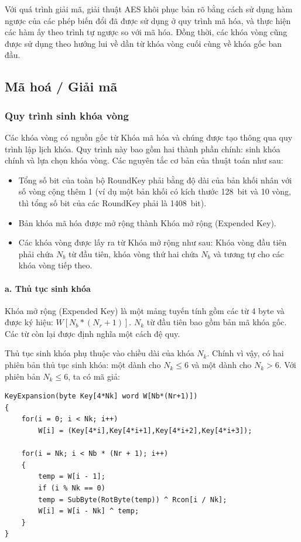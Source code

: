Với quá trình giải mã, giải thuật AES khôi phục bản rõ bằng cách sử dụng hàm ngược của các phép biến đổi đã được sử dụng ở quy trình mã hóa, và thực hiện các hàm ấy theo trình tự ngược so với mã hóa. Đồng thời, các khóa vòng cũng được sử dụng theo hướng lui về dần từ khóa vòng cuối cùng về khóa gốc ban đầu.

\subsection{Mã hoá / Giải mã}

\subsubsection{Quy trình sinh khóa vòng}

Các khóa vòng có nguồn gốc từ Khóa mã hóa và chúng được tạo thông qua quy trình lập lịch khóa. Quy trình này bao gồm hai thành phần chính: sinh khóa chính và lựa chọn khóa vòng. Các nguyên tắc cơ bản của thuật toán như sau:
\begin{itemize}
	\item Tổng số bit của toàn bộ RoundKey phải bằng độ dài của bản khối nhân với số vòng cộng thêm 1 (ví dụ một bản khối có kích thước 128~bit và 10 vòng, thì tổng số bit của các RoundKey phải là 1408~bit).
	\item Bản khóa mã hóa được mở rộng thành Khóa mở rộng (Expended Key).
	\item Các khóa vòng được lấy ra từ Khóa mở rộng như sau: Khóa vòng đầu tiên phải chứa $N_b$ từ đầu tiên, khóa vòng thứ hai chứa $N_b$ và tương tự cho các khóa vòng tiếp theo.
\end{itemize}

\paragraph{a. Thủ tục sinh khóa}\quad

Khóa mở rộng (Expended Key) là một mảng tuyến tính gồm các từ 4 byte và được ký hiệu: $W[N_b * (N_r+1)]$. $N_k$ từ đầu tiên bao gồm bản mã khóa gốc. Các từ còn lại được định nghĩa một cách đệ quy. 

Thủ tục sinh khóa phụ thuộc vào chiều dài của khóa $N_k$. Chính vì vậy, có hai phiên bản thủ tục sinh khóa: một dành cho $N_k \leq 6$ và một dành cho $N_k > 6$. Với phiên bản $N_k \leq 6$, ta có mã giả:

\begin{center}
	\begin{BVerbatim}
KeyExpansion(byte Key[4*Nk] word W[Nb*(Nr+1)])
{
	for(i = 0; i < Nk; i++)
		W[i] = (Key[4*i],Key[4*i+1],Key[4*i+2],Key[4*i+3]);
	
	for(i = Nk; i < Nb * (Nr + 1); i++)
	{
		temp = W[i - 1];
		if (i % Nk == 0)	
		temp = SubByte(RotByte(temp)) ^ Rcon[i / Nk];
		W[i] = W[i - Nk] ^ temp;
	}
}
	\end{BVerbatim}
\end{center}

